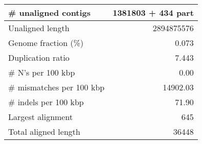\documentclass[12pt,a4paper]{article}
\begin{document}
\begin{table}[ht]
\begin{center}
\begin{tabular}{|l*{1}{|r}|}
\# unaligned contigs & 1381803 + 434 part \\ \hline
Unaligned length & 2894875576 \\ \hline
Genome fraction (\%) & 0.073 \\ \hline
Duplication ratio & 7.443 \\ \hline
\# N's per 100 kbp & 0.00 \\ \hline
\# mismatches per 100 kbp & 14902.03 \\ \hline
\# indels per 100 kbp & 71.90 \\ \hline
Largest alignment & 645 \\ \hline
Total aligned length & 36448 \\ \hline
\end{tabular}
\end{center}
\end{table}
\end{document}
